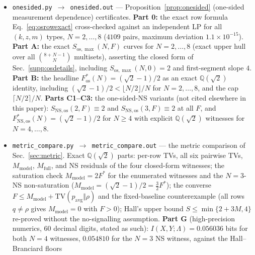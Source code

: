 \documentclass[aps,pra,reprint,superscriptaddress,floatfix]{revtex4-2}
\newcommand{\TV}{\mathrm{TV}}
\begin{document}
\begin{itemize}
  $N=3,\dots,300$ plus spot checks at $N=1000,4096,10000$: row sums $1$,
  non-negativity, $E[ab]=\sigma_{ab}$ (hence $S=4$), per-row
  $\TV\le\lceil N/4\rceil/N$, all four NS residuals $0$; explicit
  witnesses printed for $N=3,4,5$ (the $N=4$ witness is an explicit local
  decomposition of the PR box at cost $1/4$).
  \textbf{Part C:} independent HiGHS LP (float) feasibility at
  $F=\lceil N/4\rceil/N$ for $N=3,\dots,16$ --- a search cross-check
  only; the claims rest on Parts A--B.
\item \texttt{onesided.py $\to$ onesided.out} --- Proposition~\ref{prop:onesided}
  (one-sided measurement dependence) certificates. \textbf{Part 0:} the
  exact row formula Eq.~\eqref{eq:osrowexact} cross-checked against an
  independent LP for all $(k,z,m)$ types, $N=2,\dots,8$ ($4109$ pairs,
  maximum deviation $1.1\times10^{-15}$). \textbf{Part A:} the exact
  $S_{\mathrm{os},\max}(N,F)$ curves for $N=2,\dots,8$ (exact upper hull
  over all $\binom{8+N-1}{N}$ multisets), asserting the closed form of
  Sec.~\ref{supp:osdetails}, including $S_{\mathrm{os},\max}(N,0)=2$ and
  first-segment slope $4$. \textbf{Part B:} the headline
  $F^*_{\mathrm{os}}(N)=(\sqrt2-1)/2$ as an exact
  $\mathbb{Q}(\sqrt2)$ identity, including
  $(\sqrt2-1)/2<\lfloor N/2\rfloor/N$ for $N=2,\dots,8$, and the cap
  $\lceil N/2\rceil/N$. \textbf{Parts C1--C3:} the one-sided-NS variants
  (not cited elsewhere in this paper): $S_{\mathrm{NS,os}}(2,F)\equiv2$ and
  $S_{\mathrm{NS,os}}(3,F)\equiv2$ at all $F$, and
  $F^*_{\mathrm{NS,os}}(N)=(\sqrt2-1)/2$ for $N\ge4$ with explicit
  $\mathbb{Q}(\sqrt2)$ witnesses for $N=4,\dots,8$.
\item \texttt{metric\_compare.py $\to$ metric\_compare.out} --- the metric
  comparison of Sec.~\ref{sec:metric}. Exact
  $\mathbb{Q}(\sqrt2)$ parts: per-row TVs, all six pairwise TVs,
  $M_{\mathrm{model}}$, $M_{\mathrm{full}}$, and NS residuals of the four
  closed-form witnesses; the saturation check
  $M_{\mathrm{model}}=2F^*$ for the enumerated witnesses and the
  $N=3$-NS non-saturation ($M_{\mathrm{model}}=(\sqrt2-1)/2
  =\tfrac32F^*$); the converse
  $F\le M_{\mathrm{model}}+\TV(p_{\mathrm{avg}}\Vert\rho)$ and the
  fixed-baseline counterexample (all rows $q\ne\rho$ gives
  $M_{\mathrm{model}}=0$ with $F>0$); Hall's upper bound
  $S\le\min\{2+3M,4\}$ re-proved without the no-signalling assumption.
  \textbf{Part G} (high-precision numerics, $60$ decimal digits, stated
  as such): $I(X,Y;\Lambda)=0.056036$ bits for both $N=4$ witnesses,
  $0.054810$ for the $N=3$ NS witness, against the Hall--Branciard floors

\end{itemize}
\end{document}
